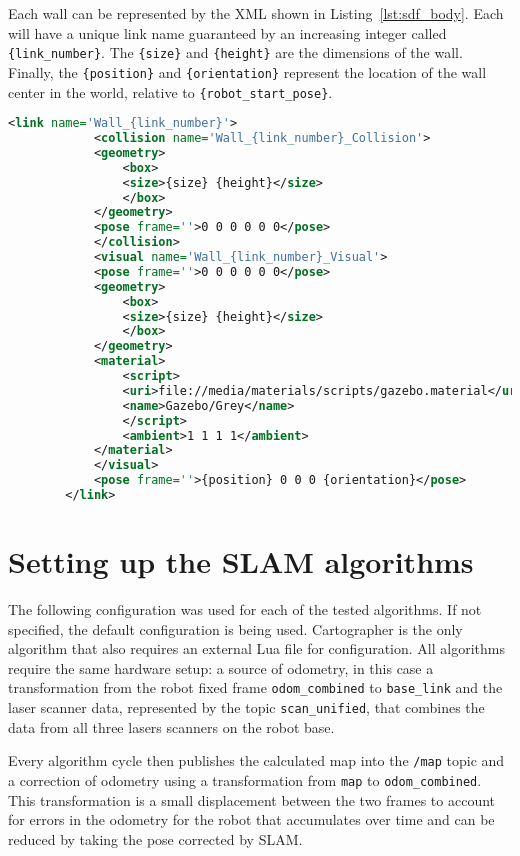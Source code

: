 Each wall can be represented by the XML shown in Listing~\ref{lst:sdf_body}. Each will have a unique link name guaranteed by an increasing integer called \texttt{\{link\_number\}}. The \texttt{\{size\}} and \texttt{\{height\}} are the dimensions of the wall. Finally, the \texttt{\{position\}} and \texttt{\{orientation\}} represent the location of the wall center in the world, relative to \texttt{\{robot\_start\_pose\}}.

\begin{lstlisting}[caption={SDF for a single wall.},label={lst:sdf_body},language=XML]
        <link name='Wall_{link_number}'>
            <collision name='Wall_{link_number}_Collision'>
            <geometry>
                <box>
                <size>{size} {height}</size>
                </box>
            </geometry>
            <pose frame=''>0 0 0 0 0 0</pose>
            </collision>
            <visual name='Wall_{link_number}_Visual'>
            <pose frame=''>0 0 0 0 0 0</pose>
            <geometry>
                <box>
                <size>{size} {height}</size>
                </box>
            </geometry>
            <material>
                <script>
                <uri>file://media/materials/scripts/gazebo.material</uri>
                <name>Gazebo/Grey</name>
                </script>
                <ambient>1 1 1 1</ambient>
            </material>
            </visual>
            <pose frame=''>{position} 0 0 0 {orientation}</pose>
        </link>
\end{lstlisting}

\section{Setting up the SLAM algorithms}\label{sec:slam}

The following configuration was used for each of the tested algorithms. If not specified, the default configuration is being used. Cartographer is the only algorithm that also requires an external Lua file for configuration. All algorithms require the same hardware setup: a source of odometry, in this case a transformation from the robot fixed frame \texttt{odom\_combined} to \texttt{base\_link} and the laser scanner data, represented by the topic \texttt{scan\_unified}, that combines the data from all three lasers scanners on the robot base.

Every algorithm cycle then publishes the calculated map into the \texttt{/map} topic and a correction of odometry using a transformation from \texttt{map} to \texttt{odom\_combined}. This transformation is a small displacement between the two frames to account for errors in the odometry for the robot that accumulates over time and can be reduced by taking the pose corrected by SLAM.

